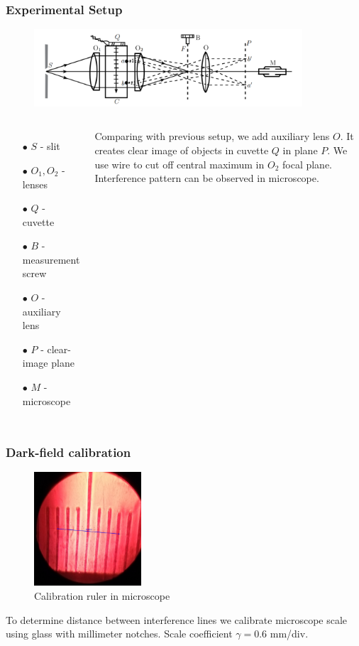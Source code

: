 \documentclass{beamer}
\begin{document}
	\begin{frame}
		\frametitle{Experimental Setup}
		\begin{figure}
			\centering
			\includegraphics[width=10cm]{res/setup2.png}
		\end{figure}
		
		\begin{columns}
			\begin{enumerate}
				\item[$\bullet$] $S$ - slit
				\item[$\bullet$] $O_1, O_2$ - lenses
				\item[$\bullet$] $Q$ - cuvette
				\item[$\bullet$] $B$ - measurement screw
				\item[$\bullet$] $O$ - auxiliary lens
				\item[$\bullet$] $P$ - clear-image plane
				\item[$\bullet$] $M$ - microscope
			\end{enumerate}
			Comparing with previous setup, we add auxiliary lens $O$. It creates clear image of objects in cuvette $Q$ in plane $P$. We use wire to cut off central maximum in $O_2$ focal plane. Interference pattern can be observed in microscope.
		\end{columns}
	\end{frame}
	
	\begin{frame}
		\frametitle{Dark-field calibration}
		
		\begin{figure}
			\includegraphics[width=4cm]{data/part2/ruler.jpg}
			\caption{Calibration ruler in microscope}
		\end{figure}
	
		To determine distance between interference lines we calibrate microscope scale using glass with millimeter notches. Scale coefficient $\gamma = 0.6$ mm/div.
		
	\end{frame}
	
\end{document}
